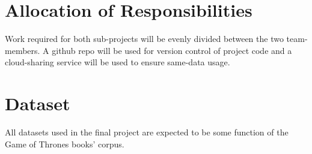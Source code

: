\documentclass[dvips,10pt]{article}
\begin{document}
\section{Allocation of Responsibilities}
Work required for both sub-projects will be evenly divided between the two team-members. A github repo will be used for version control of project code and a cloud-sharing service will be used to ensure same-data usage. 

\section{Dataset}
All datasets used in the final project are expected to be some function of the Game of Thrones books' corpus.
\end{document}
